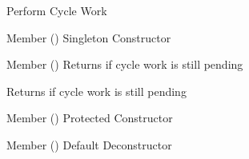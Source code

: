 \begin{DoxyRefList}
\label{todo__todo000076}%
%
Perform Cycle Work  
\item[Member \doxylink{classx_clock_a5afe719005df1e0e5636074aca239722}{x\+Clock\+::Get\+Instance} ()]\label{todo__todo000070}%
%
Singleton Constructor  
\item[Member \doxylink{classx_clock_a287dd4484683620263e1dd0deaeb63e4}{x\+Clock\+::get\+Pending\+Work\+State} ()]\label{todo__todo000071}%
%
Returns if cycle work is still pending 

\label{todo__todo000075}%
%
Returns if cycle work is still pending  
\item[Member \doxylink{classx_clock_a5ca92a56b37b60eaa5bea735348017b1}{x\+Clock\+::x\+Clock} ()]\label{todo__todo000069}%
%
Protected Constructor  
\item[Member \doxylink{classx_clock_a48548a87fc20d734d49d069f821c29de}{x\+Clock\+::\texorpdfstring{$\sim$}{\string~}x\+Clock} ()]\label{todo__todo000074}%
%
Default Deconstructor 
\end{DoxyRefList}
